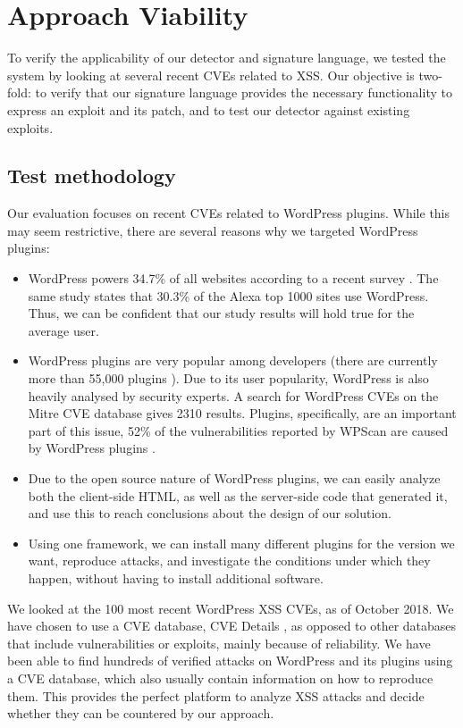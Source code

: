 \section{Approach Viability} \label{viability}

To verify the applicability of our detector and signature language, we tested the system by looking at several recent CVEs related to \ac{XSS}. Our objective is two-fold: to verify that our signature language provides the necessary functionality to express an exploit and its patch, and to test our detector against existing exploits.

\subsection{Test methodology} \label{methodology}

Our evaluation focuses on recent CVEs related to WordPress
plugins. While this may seem restrictive, there are several reasons
why we targeted WordPress plugins:
\begin{itemize}
	\item WordPress powers 34.7\% of all websites according to a recent survey  \cite{w3stats}. The same study states that 30.3\% of the Alexa top 1000 sites use WordPress. Thus, we can be confident that our study results will hold true for the average user.
	\item WordPress plugins are very popular among developers (there are currently more than 55,000 plugins \cite{wpplugins}). Due to its user popularity, WordPress is also heavily analysed by security experts. A search for WordPress CVEs on the Mitre CVE database \cite{cvemitre} gives 2310 results. Plugins, specifically, are an important part of this issue, 52\% of the vulnerabilities reported by WPScan are caused by WordPress plugins \cite{wpscan}.
	\item Due to the open source nature of WordPress plugins, we can easily analyze both the client-side HTML, as well as the server-side code that generated it, and use this to reach conclusions about the design of our solution.
	\item Using one framework, we can install many different plugins for the version we want, reproduce attacks, and investigate the conditions under which they happen, without having to install additional software.
\end{itemize}

We looked at the 100 most recent WordPress \ac{XSS} CVEs, as of October 2018. We have chosen to use a CVE database, CVE Details \cite{cvedetails}, as opposed to other databases that include vulnerabilities or exploits, mainly because of reliability. We have been able to find hundreds of verified attacks on WordPress and its plugins using a CVE database, which also usually contain information on how to reproduce them. This provides the perfect platform to analyze \ac{XSS} attacks and decide whether they can be countered by our approach. 

